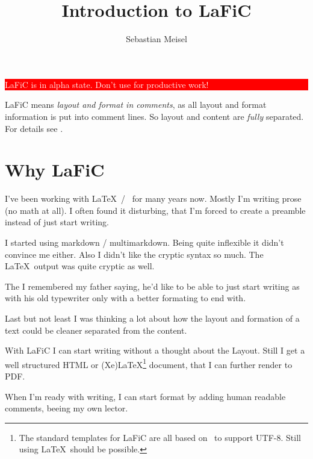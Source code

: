 \documentclass{article}
\title{Introduction to LaFiC}
\author{Sebastian Meisel}
\begin{document}
\maketitle


\colorbox{red}{\parbox{\linewidth}{%
\begin{center}
\textcolor{white}{%
LaFiC is in alpha state. Don't use for productive work!}
\end{center}

}
}

{LaFiC means \textit{layout and format in comments}, as all layout and
format information is put into comment lines. So layout and
content are \emph{fully} separated. For details see \xspace .\\}

\section{Why LaFiC}

{I've been working with \LaTeX\  / \XeLaTeX\  for many years
now. Mostly I'm writing prose (no math at all). I often
found it disturbing, that I'm forced to create a preamble
instead of just start writing.\\}

{I started using markdown / multimarkdown. Being quite
inflexible it didn't convince me either. Also I didn't like
the cryptic syntax so much. The \LaTeX\  output was quite
cryptic as well.\\}

{The I remembered my father saying, he'd like to be able to
just start writing as with his old typewriter only with a
better formating to end with.\\}

{Last but not least I was thinking a lot about how the layout
and formation of a text could be cleaner separated from the
content.\\}

{With LaFiC I can start writing without a thought about the
Layout. Still I get a well structured HTML or (Xe)LaTeX\footnote{The standard templates for LaFiC are all based on \XeLaTeX\  to support UTF-8. Still using \LaTeX\  should be possible.}\xspace 
document, that I can further render to PDF.\\}

{When I'm ready with writing, I can start format by
adding human readable comments, beeing my own lector.\\}
\end{document}
